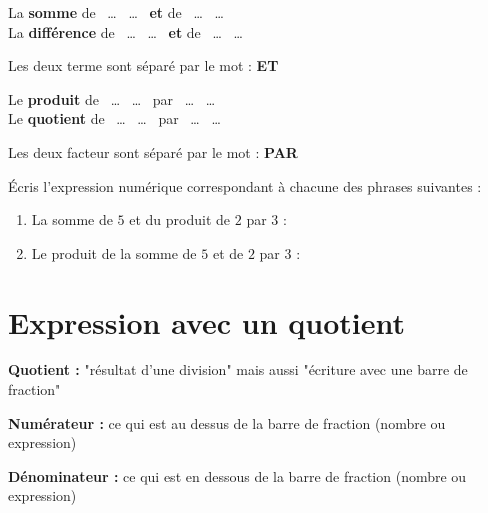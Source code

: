 \documentclass[a4paper,10pt]{report}
\begin{document}
\begin{dft}

\begin{minipage}{7cm}
La \textbf{somme} de ~\dots~ \dots~ \textbf{et} de ~\dots~ \dots~  \\      
La \textbf{différence} de ~\dots~ \dots~  \textbf{et} de ~\dots~ \dots~ 
\end{minipage}
\begin{minipage}{7cm}
Les deux terme sont séparé par le mot : \textbf{ET}
\end{minipage}           

\vspace{3mm}
\noindent \begin{minipage}{7cm}
Le \textbf{produit} de ~\dots~ \dots~ par ~\dots~ \dots~\\
Le \textbf{quotient} de ~\dots~ \dots~ par ~\dots~ \dots~
\end{minipage}
\begin{minipage}{7cm}
Les deux facteur sont séparé par le mot : \textbf{PAR}  
\end{minipage}

\end{dft}

\begin{ex}
Écris l'expression numérique correspondant à chacune des phrases suivantes :

\begin{enumerate}
\item La somme de $5$ et du produit de $2$ par $3$ : 

\noindent\grandscarreaux{\linewidth}{1.6cm}
\item Le produit de la somme de $5$ et de $2$ par $3$ :

\noindent\grandscarreaux{\linewidth}{1.6cm}
\end{enumerate}
\end{ex}

\section{Expression avec un quotient}

\begin{dft}
\textbf{Quotient : }"résultat d'une division" mais aussi "écriture avec une barre de fraction"

\textbf{Numérateur : }ce qui est au dessus de la barre de fraction (nombre ou expression)

\textbf{Dénominateur : }ce qui est en dessous de la barre de fraction (nombre ou expression)
\end{dft}
\end{document}
